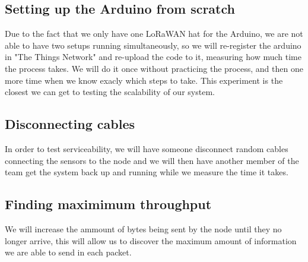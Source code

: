 	\subsection{Setting up the Arduino from scratch}
		Due to the fact that we only have one LoRaWAN hat for the Arduino, we are not able to have two setups running simultaneously, so we will re-register the arduino in "The Things Network" and re-upload the code to it, measuring how much time the process takes. We will do it once without practicing the process, and then one more time when we know exacly which steps to take. This experiment is the closest we can get to testing the scalability of our system.

	\subsection{Disconnecting cables}
		In order to test serviceability, we will have someone disconnect random cables connecting the sensors to the node and we will then have another member of the team get the system back up and running while we measure the time it takes.

	\subsection{Finding maximimum throughput}
		We will increase the ammount of bytes being sent by the node until they no longer arrive, this will allow us to discover the maximum amount of information we are able to send in each packet.

